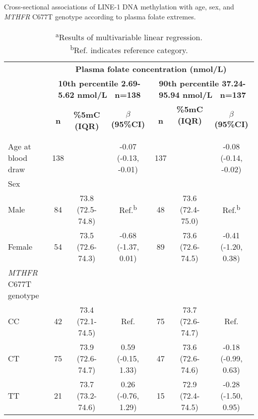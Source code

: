 \begin{flushleft}
\begin{table} [h]
\caption{Cross-sectional associations of LINE-1 DNA methylation with age, sex, and \emph{MTHFR} C677T genotype according to plasma folate extremes.}\label{table3_2}
\begin{adjustbox}{width=\textwidth}
\renewcommand{\arraystretch}{1.3}
\begin{tabular}{lcccccc}
\hline 
~ &\multicolumn{6}{c}{\centering \textbf{Plasma folate concentration (nmol/L)}}\\
\bfseries
&\multicolumn{3}{c}{\parbox[t]{3cm}{\centering \textbf{ 10th percentile 2.69-5.62 nmol/L \ n=138\\}}} 
&\multicolumn{3}{c}{\parbox[t]{3cm}{\centering \textbf{ 90th percentile 37.24-95.94 nmol/L \ n=137\\}}}\\
~ & \textbf{n} & \textbf{\%5mC (IQR)} & \textbf{$\beta$ (95\%CI)} & \textbf{n} & \textbf{ \%5mC (IQR)} ~ & \textbf{$\beta$ (95\%CI)}\\
\hline
Age at blood draw & 138 &~ & {}-0.07 (-0.13, -0.01) & 137 &~ & {}-0.08 (-0.14, -0.02)\\
Sex &~ &~ &~ &~ &~ &~\\ \quad Male & 84 & 73.8 (72.5-74.8) & Ref.\textsuperscript{b} & 48 & 73.6 (72.4-75.0) & Ref.\textsuperscript{b}\\ \quad Female & 54 & 73.5 (72.6-74.3) & {}-0.68 (-1.37, 0.01) & 89 & 73.6 (72.6-74.5) & {}-0.41 (-1.20, 0.38)\\
{\textit{MTHFR}}{ C677T genotype}&~ &~ &~ &~ &~ &~\\ \quad CC & 42 & 73.4 (72.1-74.5) & Ref. & 75 & 73.7 (72.6-74.7) & Ref.\\ \quad CT & 75 & 73.9 (72.6-74.7) & 0.59 (-0.15, 1.33) & 47 & 73.6 (72.6-74.6) & {}-0.18 (-0.99, 0.63)\\ \quad TT & 21 & 73.7 (73.2-74.6) & 0.26 (-0.76, 1.29) & 15 & 72.9 (72.4-74.5) & {}-0.28 (-1.50, 0.95)\\
\hline 
\end{tabular}
\end{adjustbox}
\caption*{\footnotesize{\textsuperscript{a}Results of multivariable linear regression.\\ \textsuperscript{b}Ref. indicates reference category.}}
\end{table}
\end{flushleft}

